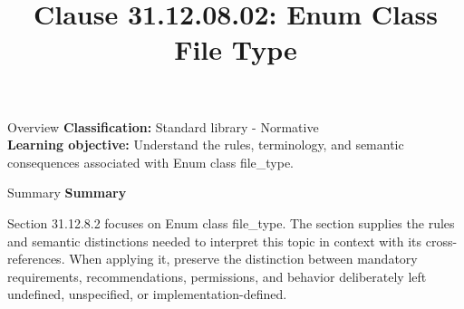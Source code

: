 \documentclass[10pt,letterpaper]{article}
\title{Clause 31.12.08.02: Enum Class File Type}
\author{}
\date{}
\begin{document}
\maketitle
\begin{CornellOverviewBox}{Overview}
\textbf{Classification:} Standard library - Normative\\[2pt]
\textbf{Learning objective:} Understand the rules, terminology, and semantic consequences associated with Enum class file\_type.
\end{CornellOverviewBox}\begin{CornellSummaryBox}{Summary}
{\sffamily\bfseries\color{Accent} Summary}\par\vspace{3pt}Section 31.12.8.2 focuses on Enum class file\_type. The section supplies the rules and semantic distinctions needed to interpret this topic in context with its cross-references. When applying it, preserve the distinction between mandatory requirements, recommendations, permissions, and behavior deliberately left undefined, unspecified, or implementation-defined.
\end{CornellSummaryBox}
\end{document}
